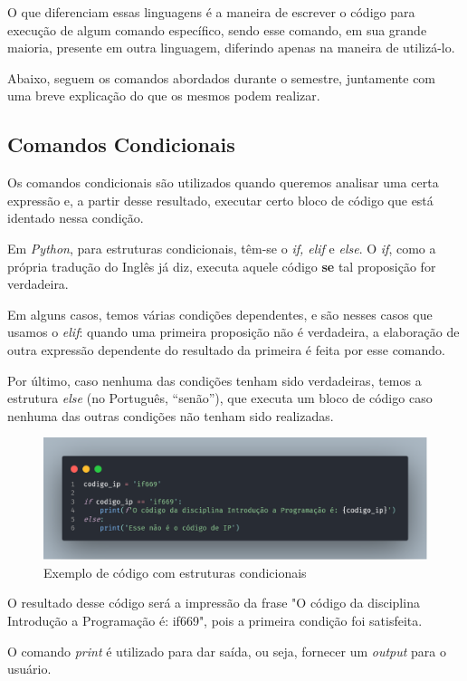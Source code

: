 \documentclass[a4paper, 12pt]{article} %
\begin{document}
O que diferenciam essas linguagens é a maneira de escrever o código para execução de algum comando específico, sendo esse comando, em sua grande maioria, presente em outra linguagem, diferindo apenas na maneira de utilizá-lo.

Abaixo, seguem os comandos abordados durante o semestre, juntamente com uma breve explicação do que os mesmos podem realizar.

\subsection{Comandos Condicionais}
Os comandos condicionais são utilizados quando queremos analisar uma certa expressão e, a partir desse resultado, executar certo bloco de código que está identado nessa condição.

Em \textit{Python}, para estruturas condicionais, têm-se o \textit{if, elif} e \textit{else}. O \textit{if}, como a própria tradução do Inglês já diz, executa aquele código \textbf{se} tal proposição for verdadeira. 

Em alguns casos, temos várias condições dependentes, e são nesses casos que usamos o \textit{elif}: quando uma primeira proposição não é verdadeira, a elaboração de outra expressão dependente do resultado da primeira é feita por esse comando. 

Por último, caso nenhuma das condições tenham sido verdadeiras, temos a estrutura \textit{else} (no Português, “senão”), que executa um bloco de código caso nenhuma das outras condições não tenham sido realizadas. 

\begin{figure}[ht]
    \centering
    \includegraphics[width = 12cm]{imagens/if.png}
    \caption{Exemplo de código com estruturas condicionais \cite{codes}}
    \label{If's}
\end{figure}
O resultado desse código será a impressão da frase "O código da disciplina Introdução a Programação é: if669", pois a primeira condição foi satisfeita. 

O comando \textit{print} é utilizado para dar saída, ou seja, fornecer um \textit{output} para o usuário.
\end{document}
